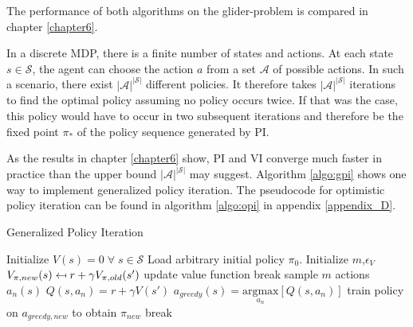 The performance of both algorithms on the glider-problem is compared in chapter \ref{chapter6}. \bigbreak

In a discrete MDP, there is a finite number of states and actions. At each state $s \in \mathcal{S}$, the agent can choose the action $a$ from a set $\mathcal{A}$ of possible actions. In such a scenario, there exist $|\mathcal{A}|^{|\mathcal{S}|}$ different policies. It therefore takes $|\mathcal{A}|^{|\mathcal{S}|}$ iterations to find the optimal policy assuming no policy occurs twice. If that was the case, this policy would have to occur in two subsequent iterations and therefore be the fixed point $\pi_*$ of the policy sequence generated by PI.

As the results in chapter \ref{chapter6} show, PI and VI converge much faster in practice than the upper bound $|\mathcal{A}|^{|\mathcal{S}|}$ may suggest. Algorithm \ref{algo:gpi} shows one way to implement generalized policy iteration. The pseudocode for optimistic policy iteration can be found in algorithm \ref{algo:opi} in appendix \ref{appendix_D}.

\begin{algorithm}[hbt]
	\caption{Generalized Policy Iteration}
	\begin{algorithmic}[0] %
			\State Initialize $V(s) = 0 \; \forall \; s \in \mathcal{S}$
			\State Load arbitrary initial policy $\pi_0$.
			\State Initialize $m$,\;$\epsilon_V$
					\State $V_{\pi,new}(s) \mathrel{\reflectbox{\ensuremath{\mapsto}}} r+\gamma V_ {\pi,old}(s')$
				\EndFor
				\State update value function
					\State break
				\EndIf
				\EndWhile
			\EndFunction
					\State sample $m$ actions $a_n(s)$
						\State $Q(s,a_n) = r + \gamma V(s')$
					\EndFor
					\State $a_{greedy}(s)=\underset{a_n}{\text{argmax}}[Q(s,a_n)]$
				\EndFor
			\EndFunction
			\State
			\State train policy on $a_{greedy,new}$ to obtain $\pi_{new}$
				\State break
			\EndIf

			\EndWhile
			\State
		\EndFunction
	\end{algorithmic}
	\label{algo:gpi}
\end{algorithm}

